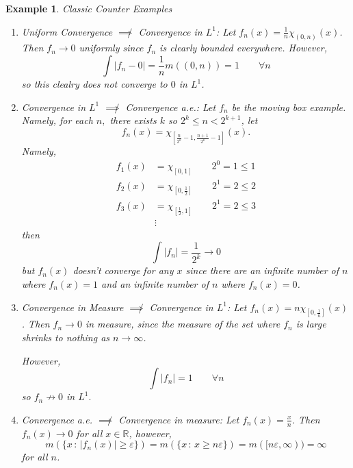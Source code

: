 \documentclass[12pt]{Qual}
\newtheorem{example}{Example}
\begin{document}
\vspace{0.5cm}
\begin{example}{\Large\textit{Classic Counter Examples}}

\begin{enumerate}[label=(\arabic*)]
\setlength\itemsep{-0.1em}
    \item Uniform Convergence $\not\implies$ Convergence in $L^1$: Let $f_n(x)=\frac{1}{n}\chi_{(0,n)}(x)$. Then $f_n\to0$ uniformly since $f_n$ is clearly bounded everywhere. However, $$\int |f_n-0|=\frac{1}{n}m((0,n))=1\qquad \forall n$$ so this clealry does not converge to $0$ in $L^1$.
    \item Convergence in $L^1$ $\not\implies$ Convergence a.e.: Let $f_n$ be the moving box example. Namely, for each $n,$ there exists $k$ so $2^k\le n<2^{k+1}$, let $$f_n(x)=\chi_{[\frac{n}{2^k}-1,\frac{n+1}{2^k}-1]}(x).$$ Namely, \begin{align*}
        f_1(x)&=\chi_{[0,1]}\qquad 2^0=1\le 1\\
        f_2(x)&=\chi_{[0,\frac{1}{2}]}\qquad 2^1=2\le 2\\
        f_3(x)&=\chi_{[\frac{1}{2},1]}\qquad 2^1=2\le 3\\
        &\vdots
    \end{align*} then $$\int|f_n|=\frac{1}{2^k}\to0$$ but $f_n(x)$ doesn't converge for any $x$ since there are an infinite number of $n$ where $f_n(x)=1$ and an infinite number of $n$ where $f_n(x)=0$.
    \item Convergence in Measure $\not\implies$ Convergence in $L^1$: Let $f_n(x)=n\chi_{[0,\frac{1}{n}]}(x)$. Then $f_n\to0$ in measure, since the measure of the set where $f_n$ is large shrinks to nothing as $n\to\infty$.

    However, $$\int|f_n|=1\qquad\forall n$$ so $f_n\not\to0$ in $L^1.$
    \item Convergence a.e. $\not\implies$ Convergence in measure: Let $f_n(x)=\frac{x}{n}$. Then $f_n(x)\to0$ for all $x\in\mathbb{R}$, however, $$m(\{x\,:\,|f_n(x)|\ge\varepsilon\})=m(\{x\,:\,x\ge n\varepsilon\})=m([n\varepsilon,\infty))=\infty$$ for all $n$.
\end{enumerate}

\end{example}
\vspace{0.5cm}
\newpage
\end{document}
